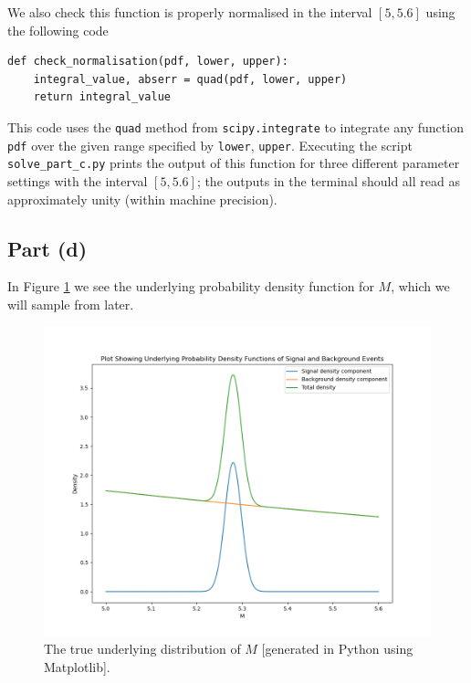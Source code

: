 \documentclass[12pt]{article}
\begin{document}
We also check this function is properly normalised in the interval $[5, 5.6]$ using the following code

\begin{lstlisting}[caption=Function checking the normalisation of the pdf for part (c).]
def check_normalisation(pdf, lower, upper):
    integral_value, abserr = quad(pdf, lower, upper)
    return integral_value
\end{lstlisting}

This code uses the \texttt{quad} method from \texttt{scipy.integrate} to integrate any function \texttt{pdf} over the given range specified by \texttt{lower}, \texttt{upper}.
Executing the script \texttt{solve\_part\_c.py} prints the output of this function for three different parameter settings with the interval $[5, 5.6]$; the outputs in the terminal should all read as approximately unity (within machine precision).

\subsection*{Part (d)}

In Figure \ref{part_d_plot} we see the underlying probability density function for $M$, which we will sample from later.

\begin{figure}[hbt]
    \includegraphics[scale=0.5]{part_d_plot.png}
    \caption{The true underlying distribution of $M$ [generated in Python using Matplotlib].}
    \label{part_d_plot}
\end{figure}
\end{document}
